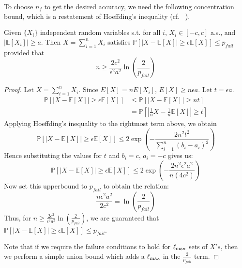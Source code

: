 To choose $n_f$ to get the desired accuracy, we need the following concentration bound, which is a restatement of Hoeffding's inequality (cf. ~\cite{motwani2010randomized}).
\begin{lemma}
Given $\{X_i\}$ independent random variables s.t. for all $i$, $X_i \in [-c, c]$ a.s., and $|\mathbb{E}[X_i]| \geq a$. 
Then $X = \sum_{i= 1}^n X_i$ satisfies
$\mathbb{P}[|X - \mathbb{E}[X]| \geq \epsilon \mathbb{E}[X] ] \leq p_{fail}$ provided that
$$n \geq \frac{2c^2}{\epsilon^2 a^2}\ln\left(\frac{2}{p_{fail}} \right)$$
\end{lemma}

\begin{proof}
Let $X = \sum_{i=1}^n X_i$.  Since $E[X] = nE[X_i]$, $E[X] \geq n \epsilon a$. Let $t = \epsilon a$.
\begin{align*}
\mathbb{P}\left[|X - \mathbb{E}[X]| \geq \epsilon \mathbb{E}[X] \right] 
&\leq \mathbb{P}\left[|X - \mathbb{E}[X]| \geq nt \right] \\
&= \mathbb{P}\left[\left|\frac{1}{n}X - \frac{1}{n}\mathbb{E}[X]\right| \geq t \right]  
\end{align*}
Applying Hoeffding's inequality to the rightmost term above, we obtain
  \[\mathbb{P}\left[|X - \mathbb{E}[X]| \geq \epsilon \mathbb{E}[X] \right] \leq 2\exp \left(-\frac{2n^2t^2}{\sum_{i=1}^n(b_i - a_i)^2}\right) \]
  Hence substituting the values for $t$ and $b_i = c$, $a_i = -c$ gives us:
\[\mathbb{P}\left[|X - \mathbb{E}[X]| \geq \epsilon \mathbb{E}[X] \right] \leq 2\exp \left(-\frac{2n^2\epsilon^2a^2}{n(4c^2)}\right) \]
Now set this upperbound to $p_{fail}$ to obtain the relation:
$$ \frac{n \epsilon^2 a^2}{2c^2} = \ln\left(\frac{2}{p_{fail}} \right) $$
Thus, for $n \geq \frac{2c^2}{\epsilon^2 a^2}\ln\left(\frac{2}{p_{fail}} \right)$, we are guaranteed that $\mathbb{P}\left[|X - \mathbb{E}[X]| \geq \epsilon \mathbb{E}[X] \right] \leq p_{fail}$.

Note that if we require the failure conditions to hold for $\ell_{\max}$ sets of $X's$, then we perform a simple union bound which adds a $\ell_{\max}$ in the $\frac{2}{p_{fail}}$ term.
\end{proof} 



